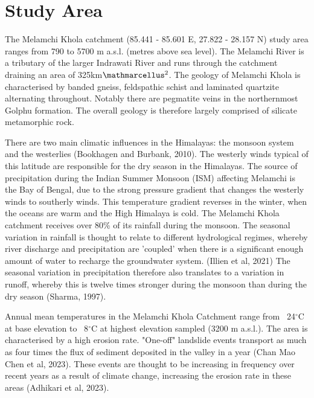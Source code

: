 
\section{Study Area}



The Melamchi Khola catchment (85.441 - 85.601 E, 27.822 - 28.157 N) study area ranges from 790 to 5700 m a.s.l. (metres above sea level). The Melamchi River is a tributary of the larger Indrawati River and runs through the catchment draining an area of 325km$\ttmath{^2}$. The geology of Melamchi Khola is characterised by banded gneiss, feldspathic schist and laminated quartzite alternating throughout. Notably there are pegmatite veins in the northernmost Golphu formation. The overall geology is therefore largely comprised of silicate metamorphic rock.

\bsk


There are two main climatic influences in the Himalayas: the monsoon system and the westerlies (Bookhagen and Burbank, 2010). The westerly winds typical of this latitude are responsible for the dry season in the Himalayas. The source of precipitation during the Indian Summer Monsoon (ISM) affecting Melamchi is the Bay of Bengal, due to the strong pressure gradient that changes the westerly winds to southerly winds. This temperature gradient reverses in the winter, when the oceans are warm and the High Himalaya is cold.  The Melamchi Khola catchment receives over 80\% of its rainfall during the monsoon. The seasonal variation in rainfall is thought to relate to different hydrological regimes, whereby river discharge and precipitation are 'coupled' when there is a significant enough amount of water to recharge the groundwater system. (Illien et al, 2021) The seasonal variation in precipitation therefore also translates to a variation in runoff, whereby this is twelve times stronger during the monsoon than during the dry season (Sharma, 1997). 

\bsk

Annual mean temperatures in the Melamchi Khola Catchment range from ~24$^{\circ}$C at base elevation to ~8$^{\circ}$C at highest elevation sampled (3200 m a.s.l.). The area is characterised by a high erosion rate. "One-off" landslide events transport as much as four times the flux of sediment deposited in the valley in a year (Chan Mao Chen et al, 2023). These events are thought to be increasing in frequency over recent years as a result of climate change, increasing the erosion rate in these areas (Adhikari et al, 2023).

